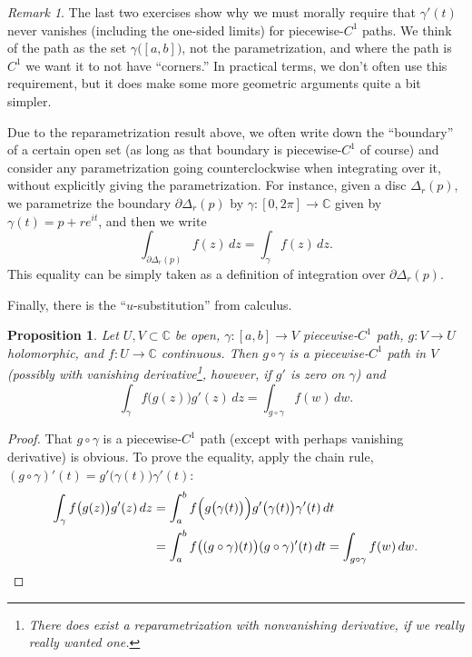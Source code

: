 \documentclass[12pt,openany]{book}
\newcommand{\C}{{\mathbb{C}}}
\newcommand{\myquote}[1]{``#1''}
\theoremstyle{plain}
\newtheorem{prop}[thm]{Proposition}
\theoremstyle{remark}
\newtheorem{remark}[thm]{Remark}
\theoremstyle{definition}
\theoremstyle{exercise}
\theoremstyle{example}
\begin{document}
\begin{remark}
The last two exercises show why we must morally
require that $\gamma'(t)$ never vanishes (including the one-sided limits)
for piecewise-$C^1$ paths.
We think of the path
as the set
$\gamma\bigl([a,b]\bigr)$,
not the parametrization, and where the path is $C^1$
we want it to not have \myquote{corners.}
In practical terms, we don't often use this requirement,
but it does make some more geometric arguments quite a bit simpler.
\end{remark}

Due to the reparametrization result above,
we often write down the \myquote{boundary} of a certain open set
(as long as that boundary is piecewise-$C^1$ of course)
and consider any parametrization going counterclockwise
when integrating over it, without explicitly giving the parametrization.
For instance, given a disc $\Delta_r(p)$, we parametrize
the boundary $\partial \Delta_r(p)$ by
$\gamma  \colon [0,2\pi] \to \C$ given by $\gamma(t) = p +
re^{it}$, and then we write
%
\begin{equation*}
\int_{\partial \Delta_r(p)} f(z) \, dz
=
\int_{\gamma} f(z) \, dz .
\end{equation*}
This equality can be simply taken as a definition of integration over
$\partial \Delta_r(p)$.

Finally, there is the \myquote{$u$-substitution} from calculus.

\begin{prop} \label{prop:usubst}
Let $U,V \subset \C$ be open, $\gamma \colon [a,b] \to V$ 
piecewise-$C^1$ path, $g \colon V \to U$ holomorphic, and $f \colon U \to \C$
continuous.  Then $g \circ \gamma$ is a piecewise-$C^1$ path in $V$
(possibly with vanishing derivative\footnote{%
There does exist a reparametrization with nonvanishing derivative, if we really
really wanted one.},
however, if $g'$ is zero on $\gamma$) and
\begin{equation*}
\int_{\gamma} f\bigl(g(z)\bigr) g'(z) \, dz
=
\int_{g \circ \gamma} f(w) \, dw .
\end{equation*}
\end{prop}

\begin{proof}
That $g \circ \gamma$ is a piecewise-$C^1$ path (except with perhaps
vanishing derivative) is obvious.  To prove the equality,
apply the chain rule,
$(g \circ \gamma)'(t) = g'\bigl(\gamma(t)\bigr) \gamma'(t)$:
\begin{equation*}
\begin{split}
\int_{\gamma} f\bigl(g(z)\bigr) g'(z) \, dz
& =
\int_a^b
f\Bigl(g\bigl(\gamma(t)\bigr)\Bigr) g'\bigl(\gamma(t)\bigr) \gamma'(t) \, dt
\\
& =
\int_a^b
f\bigl((g \circ \gamma)(t)\bigr) (g \circ \gamma)'(t) \, dt
=
\int_{g \circ \gamma} f(w) \, dw . \qedhere
\end{split}
\end{equation*}
\end{proof}
\end{document}
